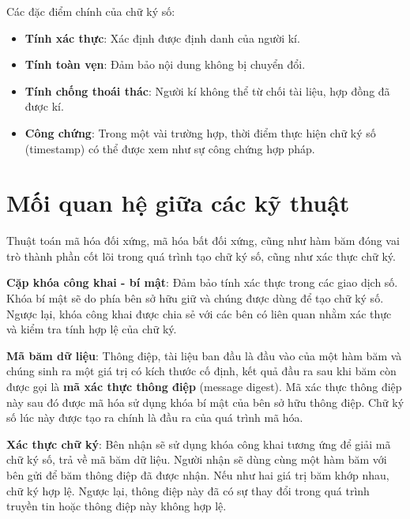 Các đặc điểm chính của chữ ký số:
\begin{itemize}
	\item \textbf{Tính xác thực}: Xác định được định danh của người kí.
	\item \textbf{Tính toàn vẹn}: Đảm bảo nội dung không bị chuyển đổi.
	\item \textbf{Tính chống thoái thác}: Người kí không thể từ chối tài liệu, hợp đồng đã được kí.
	\item \textbf{Công chứng}: Trong một vài trường hợp, thời điểm thực hiện chữ ký số (timestamp) có thể được xem như sự công chứng hợp pháp. 
	
\end{itemize}


\section{Mối quan hệ giữa các kỹ thuật}

Thuật toán mã hóa đối xứng, mã hóa bất đối xứng, cũng như hàm băm đóng vai trò thành phần cốt lõi trong quá trình tạo chữ ký số, cũng như xác thực chữ ký.

\textbf{Cặp khóa công khai - bí mật}: Đảm bảo tính xác thực trong các giao dịch số. Khóa bí mật sẽ do phía bên sở hữu giữ và chúng được dùng để tạo chữ ký số. Ngược lại, khóa công khai được chia sẻ với các bên có liên quan nhằm xác thực và kiểm tra tính hợp lệ của chữ ký.

\textbf{Mã băm dữ liệu}: Thông điệp, tài liệu ban đầu là đầu vào của một hàm băm và chúng sinh ra một giá trị có kích thước cố định, kết quả đầu ra sau khi băm còn được gọi là \textbf{mã xác thực thông điệp} (message digest). Mã xác thực thông điệp này sau đó được mã hóa sử dụng khóa bí mật của bên sở hữu thông điệp. Chữ ký số lúc này được tạo ra chính là đầu ra của quá trình mã hóa.

\textbf{Xác thực chữ ký}: Bên nhận sẽ sử dụng khóa công khai tương ứng để giải mã chữ ký số, trả về mã băm dữ liệu. Người nhận sẽ dùng cùng một hàm băm với bên gửi để băm thông điệp đã được nhận. Nếu như hai giá trị băm khớp nhau, chữ ký hợp lệ. Ngược lại, thông điệp này đã có sự thay đổi trong quá trình truyền tin hoặc thông điệp này không hợp lệ. \nocite{geeksforgeeks_digi}

